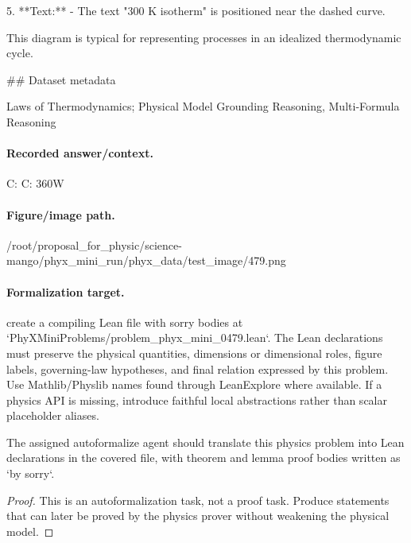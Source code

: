 5. **Text:**
   - The text "300 K isotherm" is positioned near the dashed curve.

This diagram is typical for representing processes in an idealized thermodynamic cycle.

\#\# Dataset metadata

Laws of Thermodynamics; Physical Model Grounding Reasoning, Multi-Formula Reasoning

\paragraph{Recorded answer/context.}
C: C: 360W

\paragraph{Figure/image path.}
/root/proposal\_for\_physic/science-mango/phyx\_mini\_run/phyx\_data/test\_image/479.png

\paragraph{Formalization target.}
create a compiling Lean file with sorry bodies at `PhyXMiniProblems/problem\_phyx\_mini\_0479.lean`. The Lean declarations must preserve the physical quantities, dimensions or dimensional roles, figure labels, governing-law hypotheses, and final relation expressed by this problem.
Use Mathlib/Physlib names found through LeanExplore where available. If a physics API is missing, introduce faithful local abstractions rather than scalar placeholder aliases.

\begin{theorem}
\label{thm:physics:phyx_mini_0479:target}
The assigned autoformalize agent should translate this physics problem into Lean declarations in the covered file, with theorem and lemma proof bodies written as `by sorry`.
\end{theorem}
\begin{proof}
This is an autoformalization task, not a proof task. Produce statements that can later be proved by the physics prover without weakening the physical model.
\end{proof}

